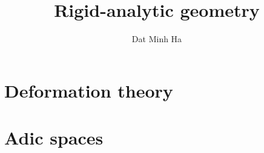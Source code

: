 

\setcounter{chapter}{-1}




	\title{Rigid-analytic geometry}
	
	\author{Dat Minh Ha}
	\maketitle
	
	\begin{abstract}
	    
	\end{abstract}
	
	{
      \hypersetup{} 
      \dominitoc
      \tableofcontents %
    }
    
    
    
    \chapter{Deformation theory}
        \begin{abstract}
            
        \end{abstract}
        
        \minitoc
    
        
        
        
        
        
    
    \chapter{Adic spaces}
        \begin{abstract}
            
        \end{abstract}
        
        \minitoc
        
        
        
        
        
        
        
